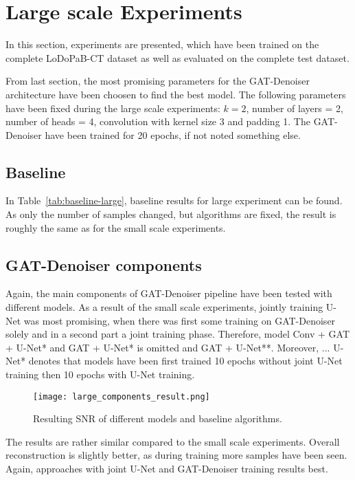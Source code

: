 \section{Large scale Experiments}

In this section, experiments are presented, which have been trained on the complete LoDoPaB-CT dataset
as well as evaluated on the complete test dataset.

From last section, the most promising parameters for the GAT-Denoiser architecture have been choosen
to find the best model. The following parameters have been fixed during the large scale experiments:
$k=2$, number of layers = 2, number of heads = 4, convolution with kernel size 3 and padding 1.
The GAT-Denoiser have been trained for 20 epochs, if not noted something else.


\subsection{Baseline}
In Table~\ref{tab:baseline-large}, baseline results for large experiment can be found.
As only the number of samples changed, but algorithms are fixed, the result is roughly 
the same as for the small scale experiments.

\subsection{GAT-Denoiser components}
Again, the main components of GAT-Denoiser pipeline have been tested with different models.
As a result of the small scale experiments, jointly training U-Net was most promising, 
when there was first some training on GAT-Denoiser solely and in a second part a joint training phase.
Therefore, model {Conv + GAT + U-Net*} and {GAT + U-Net*} is omitted and {GAT + U-Net**}.
Moreover, {... U-Net*} denotes that models have been first trained 10 epochs without
joint U-Net training then 10 epochs with U-Net training.


\begin{figure}[H]
  \centering
  \label{fig:large_components}
  \texttt{[image: large\_components\_result.png]}
  \caption{
    Resulting SNR of different models and baseline algorithms.
    }
\end{figure}

The results are rather similar compared to the small scale experiments.
Overall reconstruction is slightly better, as during training more samples have been seen.
Again, approaches with joint U-Net and GAT-Denoiser training results best.

